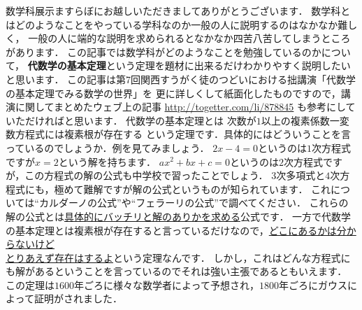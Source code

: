 


数学科展示ますらぼにお越しいただきましてありがとうございます．
数学科とはどのようなことをやっている学科なのか一般の人に説明するのはなかなか難しく，
一般の人に端的な説明を求められるとなかなか四苦八苦してしまうところがあります．
この記事では数学科がどのようなことを勉強しているのかについて，
\textbf{代数学の基本定理}という定理を題材に出来るだけわかりやすく説明したいと思います．
この記事は第7回関西すうがく徒のつどいにおける拙講演「代数学の基本定理でみる数学の世界」を
更に詳しくして紙面化したものですので，講演に関してまとめたウェブ上の記事 \url{http://togetter.com/li/878845} も参考にしていただければと思います．
代数学の基本定理とは
\thm
次数が$1$以上の複素係数一変数方程式には複素根が存在する
\thmx
という定理です．具体的にはどういうことを言っているのでしょうか．例を見てみましょう．
\ex
$2x-4=0$というのは$1$次方程式ですが$x=2$という解を持ちます．
\exx
\ex
$ax^2+bx+c=0$というのは$2$次方程式ですが，この方程式の解の公式も中学校で習ったことでしょう．
\exx
\ex
$3$次多項式と$4$次方程式にも，極めて難解ですが解の公式というものが知られています．
これについては``カルダーノの公式''や``フェラーリの公式''で調べてください．
\exx
これらの解の公式とは\underline{具体的にバッチリと解のありかを求める}公式です．
一方で代数学の基本定理とは複素根が存在すると言っているだけなので，\underline{どこにあるかは分からないけど}\\\underline{とりあえず存在はするよ}という定理なんです．
しかし，これはどんな方程式にも解があるということを言っているのでそれは強い主張であるともいえます．
この定理は$1600$年ごろに様々な数学者によって予想され，$1800$年ごろにガウスによって証明がされました．

